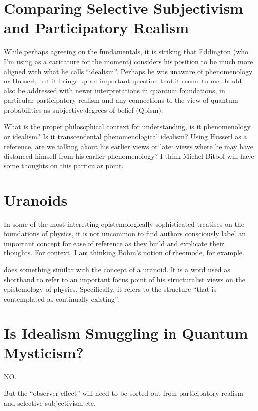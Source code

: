\section{Comparing Selective Subjectivism and Participatory Realism}

While perhaps agreeing on the fundamentals, it is striking that Eddington (who I'm using as a caricature for the moment) considers his position to be much more aligned with what he calls ``idealism''.  Perhaps he was unaware of phenomenology or Husserl, but it brings up an important question that it seems to me should also be addressed with newer interpretations in quantum foundations, in particular participatory realism and any connections to the view of quantum probabilities as subjective degrees of belief (Qbism).

What is the proper philosophical context for understanding, is it phenomenology or idealism?  Is it transcendental phenomenological idealism?  Using Husserl as a reference, are we talking about his earlier views or later views where he may have distanced himself from his earlier phenomenology?  I think Michel Bitbol will have some thoughts on this particular point.


\section{Uranoids}

In some of the most interesting epistemologically sophisticated treatises on the foundations of physics, it is not uncommon to find authors consciously label an important concept for ease of reference as they build and explicate their thoughts.  For context, I am thinking Bohm's notion of rheomode, for example.

\cite{Eddington1939} does something similar with the concept of a uranoid.  It is a word used as shorthand to refer to an important focus point of his structuralist views on the epistemology of physics.  Specifically, it refers to the structure ``that is contemplated as continually existing''.  \citep[p. 166]{Eddington1939}

\section{Is Idealism Smuggling in Quantum Mysticism?}

NO.

But the ``observer effect'' will need to be sorted out from participatory realism and selective subjectivism etc.

